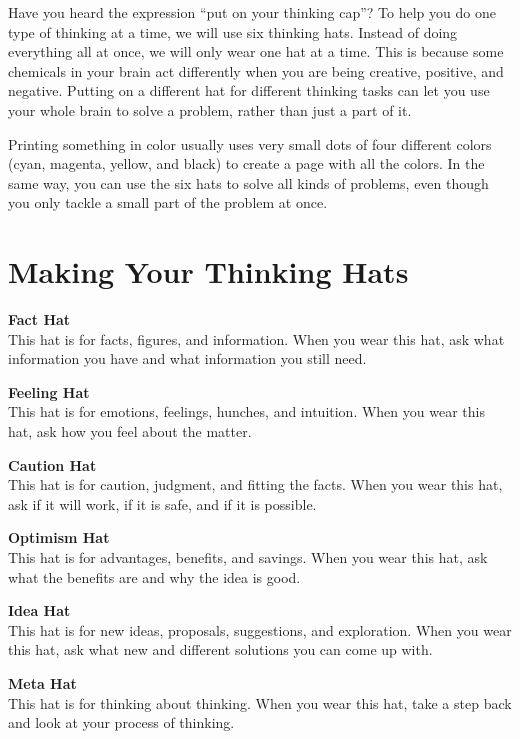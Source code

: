 Have you heard the expression ``put on your thinking cap''? To help you do one type of thinking at a time, we will use six thinking hats. Instead of doing everything all at once, we will only wear one hat at a time. This is because some chemicals in your brain act differently when you are being creative, positive, and negative. Putting on a different hat for different thinking tasks can let you use your whole brain to solve a problem, rather than just a part of it.

Printing something in color usually uses very small dots of four different colors (cyan, magenta, yellow, and black) to create a page with all the colors. In the same way, you can use the six hats to solve all kinds of problems, even though you only tackle a small part of the problem at once.

\newpage

\section*{Making Your Thinking Hats}


\textbf{Fact Hat} \\
This hat is for facts, figures, and information. When you wear this hat, ask what information you have and what information you still need.

\textbf{Feeling Hat} \\
This hat is for emotions, feelings, hunches, and intuition. When you wear this hat, ask how you feel about the matter.

\textbf{Caution Hat} \\
This hat is for caution, judgment, and fitting the facts. When you wear this hat, ask if it will work, if it is safe, and if it is possible.

\textbf{Optimism Hat} \\
This hat is for advantages, benefits, and savings. When you wear this hat, ask what the benefits are and why the idea is good.

\textbf{Idea Hat} \\
This hat is for new ideas, proposals, suggestions, and exploration. When you wear this hat, ask what new and different solutions you can come up with.

\textbf{Meta Hat} \\
This hat is for thinking about thinking. When you wear this hat, take a step back and look at your process of thinking.

